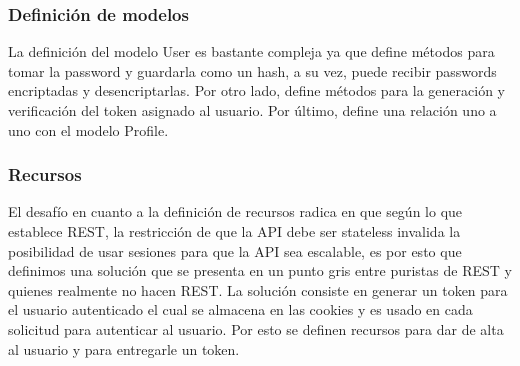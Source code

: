 \documentclass[a4paper,12pt]{article}
\begin{document}
	{\scriptsize
	\begin{center} %
	\centering
    	\end{center}
	}
    
\subsubsection{Definición de modelos}
La definición del modelo User es bastante compleja ya que define métodos para tomar la password  y guardarla como un hash, a su vez, puede recibir passwords encriptadas y desencriptarlas. Por otro lado, define métodos para la generación y verificación del token asignado al usuario. Por último, define una relación uno a uno con el modelo Profile.

\subsubsection{Recursos}
El desafío en cuanto a la definición de recursos radica en que según lo que establece REST, la restricción de que la API debe ser stateless invalida la posibilidad de usar sesiones para que la API sea escalable, es por esto que definimos una solución que se presenta en un punto gris entre puristas de REST y quienes realmente no hacen REST. La solución consiste en generar un token para el usuario autenticado el cual se almacena en las cookies y es usado en cada solicitud para autenticar al usuario. Por esto se definen recursos para dar de alta al usuario y para entregarle un token.
\end{document}
